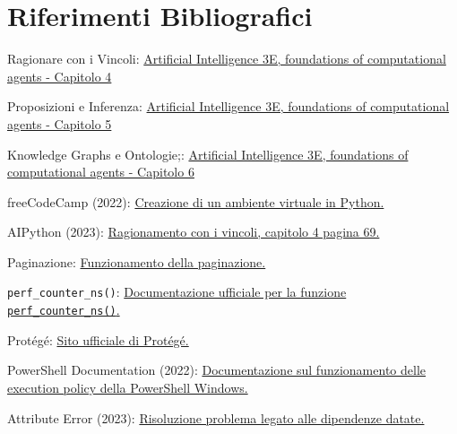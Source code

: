 \documentclass[12pt, letterpaper]{article}
\begin{document}
\section{Riferimenti Bibliografici}


\begin{thebibliography}{100}
      Ragionare con i Vincoli: \href{https://artint.info/3e/html/ArtInt3e.Ch4.html}{
            Artificial Intelligence 3E, foundations of computational agents - Capitolo 4
      }

      Proposizioni e Inferenza: \href{https://artint.info/3e/html/ArtInt3e.Ch5.html}{
            Artificial Intelligence 3E, foundations of computational agents - Capitolo 5
      }

      Knowledge Graphs e Ontologie;: \href{https://artint.info/3e/html/ArtInt3e.Ch16.html}{
            Artificial Intelligence 3E, foundations of computational agents - Capitolo 6
      }

      freeCodeCamp (2022):  \href{https://www.freecodecamp.org/news/how-to-setup-virtual-environments-in-python/}{
            Creazione di un ambiente virtuale in Python.
      }

      AIPython (2023): \href{https://artint.info/AIPython/aipython/aipython.pdf}{
            Ragionamento con i vincoli, capitolo 4 pagina 69.
      }

      Paginazione: \href{https://www.educative.io/answers/what-is-pagination}{
            Funzionamento della paginazione.
      }


      \lstinline|perf_counter_ns()|: \href{https://docs.python.org/3/library/time.html#time.perf_counter_ns}{
            Documentazione ufficiale per la funzione \lstinline|perf_counter_ns()|.
      }

      Protégé: \href{https://protege.stanford.edu/}{Sito ufficiale di Protégé.}


      PowerShell Documentation (2022):
      \href{https://learn.microsoft.com/en-gb/powershell/module/microsoft.powershell.core/about/about_execution_policies?view=powershell-7.4}{
            Documentazione sul funzionamento delle execution policy della PowerShell Windows.
      }

      Attribute Error (2023): \href{https://stackoverflow.com/questions/70749690/attributeerror-module-collections-has-no-attribute-mapping}{
            Risoluzione problema legato alle dipendenze datate.
      }
\end{thebibliography}
\end{document}
